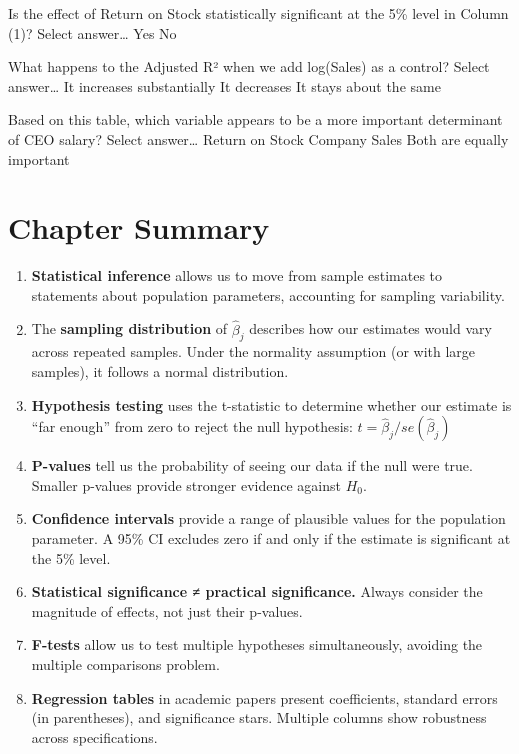 \documentclass[
  letterpaper,
  DIV=11,
  numbers=noendperiod]{scrreprt}
\begin{document}
Is the effect of Return on Stock statistically significant at the 5\%
level in Column (1)? Select answer\ldots{} Yes No

What happens to the Adjusted R² when we add log(Sales) as a control?
Select answer\ldots{} It increases substantially It decreases It stays
about the same

Based on this table, which variable appears to be a more important
determinant of CEO salary? Select answer\ldots{} Return on Stock Company
Sales Both are equally important

\section{Chapter Summary}\label{chapter-summary}

\begin{tcolorbox}[enhanced jigsaw, arc=.35mm, bottomrule=.15mm, bottomtitle=1mm, breakable, colback=white, colbacktitle=quarto-callout-tip-color!10!white, colframe=quarto-callout-tip-color-frame, coltitle=black, left=2mm, leftrule=.75mm, opacityback=0, opacitybacktitle=0.6, rightrule=.15mm, title=\textcolor{quarto-callout-tip-color}{\faLightbulb}\hspace{0.5em}{Key Takeaways}, titlerule=0mm, toprule=.15mm, toptitle=1mm]

\begin{enumerate}
\def\labelenumi{\arabic{enumi}.}
\item
  \textbf{Statistical inference} allows us to move from sample estimates
  to statements about population parameters, accounting for sampling
  variability.
\item
  The \textbf{sampling distribution} of \(\hat{\beta}_j\) describes how
  our estimates would vary across repeated samples. Under the normality
  assumption (or with large samples), it follows a normal distribution.
\item
  \textbf{Hypothesis testing} uses the t-statistic to determine whether
  our estimate is ``far enough'' from zero to reject the null
  hypothesis: \(t = \hat{\beta}_j / se(\hat{\beta}_j)\)
\item
  \textbf{P-values} tell us the probability of seeing our data if the
  null were true. Smaller p-values provide stronger evidence against
  \(H_0\).
\item
  \textbf{Confidence intervals} provide a range of plausible values for
  the population parameter. A 95\% CI excludes zero if and only if the
  estimate is significant at the 5\% level.
\item
  \textbf{Statistical significance ≠ practical significance.} Always
  consider the magnitude of effects, not just their p-values.
\item
  \textbf{F-tests} allow us to test multiple hypotheses simultaneously,
  avoiding the multiple comparisons problem.
\item
  \textbf{Regression tables} in academic papers present coefficients,
  standard errors (in parentheses), and significance stars. Multiple
  columns show robustness across specifications.
\end{enumerate}

\end{tcolorbox}
\end{document}
